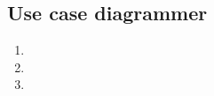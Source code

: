 \subsection{Use case diagrammer}
\begin{center}
	\begin{enumerate}
		\item{ 
			\begin{minipage}[t]{\linewidth}
          			\raggedright
			\end{minipage}
		}
		\item{ 
			\begin{minipage}[t]{\linewidth}
          			\raggedright
			\end{minipage}
		}
		\item{ 
			\begin{minipage}[t]{\linewidth}
          			\raggedright
			\end{minipage}
		}
	\end{enumerate}
\end{center}